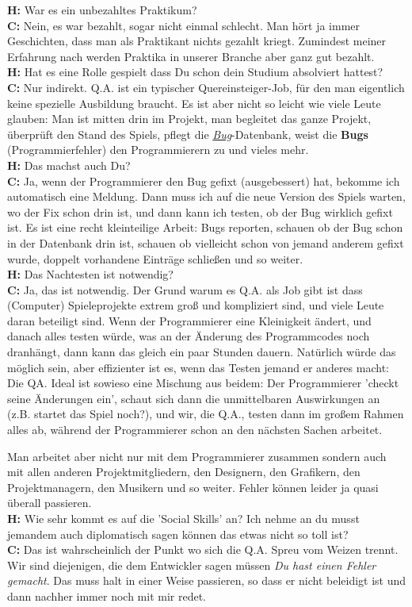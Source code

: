 \documentclass[10pt,a4paper,ngerman,twoside]{article} %
\begin{document}
\textbf{H:} War es ein unbezahltes Praktikum? \\
\textbf{C:} Nein, es war bezahlt, sogar nicht einmal schlecht. Man hört ja immer Geschichten, dass man als Praktikant nichts gezahlt kriegt. Zumindest meiner Erfahrung nach werden Praktika in unserer Branche aber ganz gut bezahlt. \\
\textbf{H:} Hat es eine Rolle gespielt dass Du schon dein Studium absolviert hattest? \\
\textbf{C:} Nur indirekt. Q.A. ist ein typischer Quereinsteiger-Job, für den man eigentlich keine spezielle Ausbildung braucht. Es ist aber nicht so leicht wie viele Leute glauben: Man ist mitten drin im Projekt, man begleitet das ganze Projekt, überprüft den Stand des Spiels, pflegt die \href{https://de.wikipedia.org/wiki/Programmfehler}{\textit{Bug}}-Datenbank, weist die \textbf{Bugs} (Programmierfehler) den Programmierern zu und vieles mehr.  \\
\textbf{H:} Das machst auch Du? \\
\textbf{C:} Ja, wenn der Programmierer den Bug gefixt (ausgebessert) hat, bekomme ich automatisch eine Meldung. Dann muss ich auf die neue Version des Spiels warten, wo der Fix schon drin ist, und dann kann ich testen, ob der Bug wirklich gefixt ist. Es ist eine recht kleinteilige Arbeit: Bugs reporten, schauen ob der Bug schon in der Datenbank drin ist, schauen ob vielleicht schon von jemand anderem gefixt wurde, doppelt vorhandene Einträge schließen und so weiter. \\
\textbf{H:} Das Nachtesten ist notwendig? \\
\textbf{C:} Ja, das ist notwendig. Der Grund warum es Q.A. als Job gibt ist dass (Computer) Spieleprojekte extrem groß und kompliziert sind, und viele Leute daran beteiligt sind. Wenn der Programmierer eine Kleinigkeit ändert, und danach alles testen würde, was  an der Änderung des Programmcodes noch dranhängt, dann kann das  gleich ein paar Stunden dauern. Natürlich würde das möglich sein, aber effizienter ist es, wenn das Testen jemand er anderes macht: Die QA. Ideal ist sowieso eine Mischung aus beidem: Der Programmierer 'checkt seine Änderungen ein', schaut sich dann die unmittelbaren Auswirkungen an (z.B. startet das Spiel noch?), und wir, die Q.A., testen dann im großem Rahmen alles ab, während der Programmierer schon an den nächsten Sachen arbeitet.

Man arbeitet aber nicht nur mit dem Programmierer zusammen sondern auch mit allen anderen Projektmitgliedern, den Designern, den Grafikern, den Projektmanagern, den Musikern und so weiter. Fehler können leider ja quasi überall passieren. \\
\textbf{H:} Wie sehr kommt es auf die 'Social Skills' an? Ich nehme an du musst jemandem auch diplomatisch sagen können das etwas nicht so toll ist? \\
\textbf{C:} Das ist wahrscheinlich der Punkt wo sich die Q.A. Spreu vom Weizen trennt. Wir sind diejenigen, die dem Entwickler sagen müssen \emph{Du hast einen Fehler gemacht}. Das muss halt in einer Weise passieren, so dass er nicht beleidigt ist und dann nachher immer noch mit mir redet.
\end{document}
